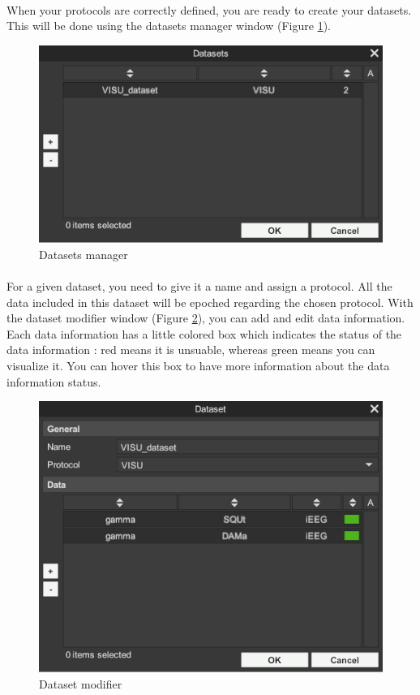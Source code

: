 \documentclass[a4paper]{article}
\begin{document}
\paragraph{} When your protocols are correctly defined, you are ready to create your datasets. This will be done using the datasets manager window (Figure \ref{datasetGestionUI}).
\begin{figure}[H]
\begin{center}
\includegraphics[scale=0.5]{DatasetGestion.png}
\end{center}
\caption{\label{datasetGestionUI}Datasets manager}
\end{figure}
\paragraph{} For a given dataset, you need to give it a name and assign a protocol. All the data included in this dataset will be epoched regarding the chosen protocol. With the dataset modifier window (Figure \ref{datasetModifierUI}), you can add and edit data information. Each data information has a little colored box which indicates the status of the data information : red means it is unsuable, whereas green means you can visualize it. You can hover this box to have more information about the data information status.
\begin{figure}[H]
\begin{center}
\includegraphics[scale=0.5]{DatasetModifier.png}
\end{center}
\caption{\label{datasetModifierUI}Dataset modifier}
\end{figure}
\end{document}
